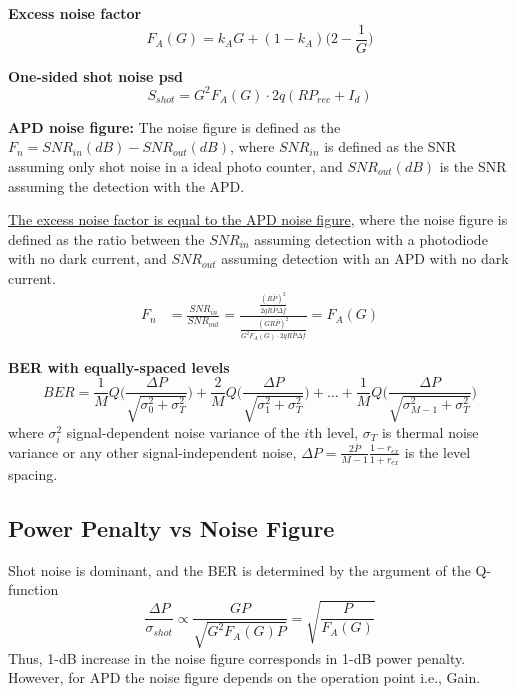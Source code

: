 \documentclass[a4paper]{article}
\begin{document}
\textbf{Excess noise factor}
\begin{equation}
F_A(G) = k_AG + (1-k_A)\Big(2 - \frac{1}{G}\Big)
\end{equation}

\textbf{One-sided shot noise psd}
\begin{equation}
S_{shot} = G^2F_A(G)\cdot 2q(RP_{rec} + I_d)
\end{equation}

\textbf{APD noise figure:} The noise figure is defined as the $F_n = SNR_{in}(dB) - SNR_{out}(dB)$, where $SNR_{in}$ is defined as the SNR assuming only shot noise in a ideal photo counter, and $SNR_{out}(dB)$ is the SNR assuming the detection with the APD.

\underline{The excess noise factor is equal to the APD noise figure}, where the noise figure is defined as the ratio between the $SNR_{in}$ assuming detection with a photodiode with no dark current, and $SNR_{out}$ assuming detection with an APD with no dark current.
\begin{align}
F_n &= \frac{SNR_{in}}{SNR_{out}} = \frac{\frac{(R\bar{P})^2}{2qR\bar{P}\Delta f}}{\frac{(GR\bar{P})^2}{G^2F_A(G)\cdot 2qR\bar{P}\Delta f}} = F_A(G)
\end{align}

\textbf{BER with equally-spaced levels}
\begin{equation}
BER = \frac{1}{M}Q\bigg(\frac{\Delta P}{\sqrt{\sigma_{0}^2 + \sigma_T^2}}\bigg) + \frac{2}{M}Q\bigg(\frac{\Delta P}{\sqrt{\sigma_{1}^2 + \sigma_T^2}}\bigg) + \ldots + \frac{1}{M}Q\bigg(\frac{\Delta P}{\sqrt{\sigma_{M-1}^2 + \sigma_T^2}}\bigg)
\end{equation}
where $\sigma_{i}^2$ signal-dependent noise variance of the $i$th level, $\sigma_{T}$ is thermal noise variance or any other signal-independent noise, $\Delta P = \frac{2\bar{P}}{M-1}\frac{1-r_{ex}}{1 + r_{ex}}$ is the level spacing.

\subsection{Power Penalty vs Noise Figure}

Shot noise is dominant, and the BER is determined by the argument of the Q-function
\begin{equation}
\frac{\Delta P}{\sigma_{shot}} \propto \frac{GP}{\sqrt{G^2F_A(G)P}} = \sqrt{\frac{P}{F_A(G)}}
\end{equation}
Thus, 1-dB increase in the noise figure corresponds in 1-dB power penalty. However, for APD the noise figure depends on the operation point i.e., Gain.
\end{document}
